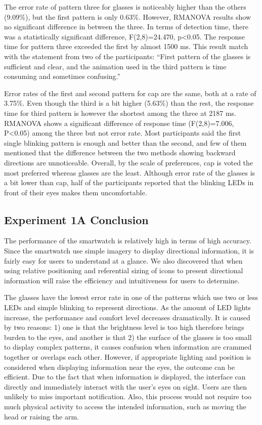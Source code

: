 \documentclass{sigchi}
\begin{document}
The error rate of pattern three for glasses is noticeably higher than the others (9.09\%), but the first pattern is only 0.63\%. However, RMANOVA results show no significant difference in between the three. In terms of detection time, there was a statistically significant difference, F(2,8)=24.470, p\textless0.05. The response time for pattern three exceeded the first by almost 1500 ms. This result match with the statement from two of the participants: \textquotedblleft First pattern of the glasses is sufficient and clear, and the animation used in the third pattern is time consuming and sometimes confusing.\textquotedblright

Error rates of the first and second pattern for cap are the same, both at a rate of 3.75\%. Even though the third is a bit higher (5.63\%) than the rest, the response time for third pattern is however the shortest among the three at 2187 ms. RMANOVA shows a significant difference of response time (F(2,8)=7.006, P\textless0.05) among the three but not error rate. Most participants said the first single blinking pattern is enough and better than the second, and few of them mentioned that the difference between the two methods showing backward directions are unnoticeable. Overall, by the scale of preferences, cap is voted the most preferred whereas glasses are the least. Although error rate of the glasses is a bit lower than cap, half of the participants reported that the blinking LEDs in front of their eyes makes them uncomfortable.

\subsection{Experiment 1A Conclusion}
The performance of the smartwatch is relatively high in terms of high accuracy. Since the smartwatch use simple imagery to display directional information, it is fairly easy for users to understand at a glance. We also discovered that when using relative positioning and referential sizing of icons to present directional information will raise the efficiency and intuitiveness for users to determine.

The glasses have the lowest error rate in one of the patterns which use two or less LEDs and simple blinking to represent directions. As the amount of LED lights increase, the performance and comfort level decreases dramatically. It is caused by two reasons: 1) one is that the brightness level is too high therefore brings burden to the eyes, and another is that 2) the surface of the glasses is too small to display complex patterns, it causes confusion when information are crammed together or overlaps each other. However, if appropriate lighting and position is considered when displaying information near the eyes, the outcome can be efficient. Due to the fact that when information is displayed, the interface can directly and immediately interact with the user's eyes on sight. Users are then unlikely to miss important notification. Also, this process would not require too much physical activity to access the intended information, such as moving the head or raising the arm.
\end{document}
